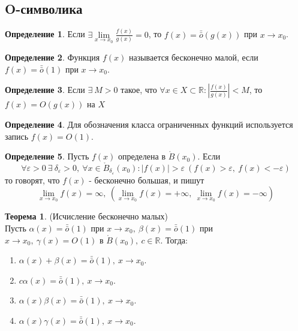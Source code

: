 \documentclass[a4paper, 12pt]{article}
\newcommand{\R}{\mathbb{R}}
\newcommand{\Bo}{\mathring{B}}
\renewcommand{\epsilon}{\varepsilon}
\newcommand{\om}{\bar{\bar{o}}}
\theoremstyle{definition}
\newtheorem*{definition}{Определение}
\newtheorem*{theorem}{Теорема}
\begin{document}
    \subsection{O-символика}
        \begin{definition}
            Если $\exists \lim\limits_{x\to x_0}\frac{f(x)}{g(x)}=0$, то $f(x)=\om(g(x))$ при $x\to x_0$.
        \end{definition} 
        \begin{definition}
            Функция $f(x)$ называется бесконечно малой, если $f(x)=\om(1)$ при $x\to x_0$.
        \end{definition}
        \begin{definition}
            Если $\exists\ M>0$ такое, что $\forall x\in X\subset \R: |\frac{f(x)}{g(x)}|<M$, то\\
            $f(x)=O(g(x))$ на $X$
        \end{definition} 
        \begin{definition}
            Для обозначения класса ограниченных функций используется запись $f(x)=O(1)$.
        \end{definition}
        \begin{definition}
            Пусть $f(x)$ определена в $\Bo(x_0)$. Если 
            \[\forall \epsilon>0\ \exists\ \delta{_\epsilon}>0,\ \forall x\in \Bo_{\delta_{\epsilon}}(x_0): |f(x)|>\epsilon\ (f(x)>\epsilon,\ f(x)<-\epsilon)\] то говорят, что $f(x)$ - бесконечно большая, и пишут
            \[\lim\limits_{x\to x_0}f(x)=\infty,\ (\lim\limits_{x\to x_0}f(x)=+\infty,\ \lim\limits_{x\to x_0}f(x)=-\infty)\]
        \end{definition}
        \begin{theorem} (Исчисление бесконечно малых)\\
            Пусть $\alpha(x)=\om(1)$ при $x\to x_0,\ \beta(x)=\om(1)$ при $x\to x_0,\ \gamma(x)=O(1)$ в $\Bo(x_0),\ c\in \R$. Тогда:
            \begin{enumerate}
                \item $\alpha(x)+\beta(x)=\om(1),\ x\to x_0$.
                \item $c \alpha(x)=\om(1),\ x\to x_0$.
                \item $\alpha(x)\beta(x)=\om(1),\ x\to x_0$.
                \item $\alpha(x)\gamma(x)=\om(1),\ x\to x_0$.
            \end{enumerate}
        \end{theorem} 
\end{document}

